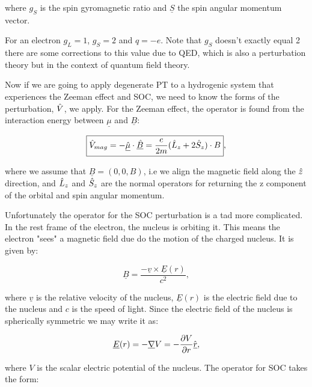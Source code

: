 \noindent where $g_S$ is the spin gyromagnetic ratio and $\underline{S}$ the spin angular momentum vector.

\noindent For an electron $g_L = 1$, $g_S = 2$ and $q = -e$. Note that $g_S$ doesn't exactly equal 2 there are some corrections to this value due to QED, which is also a perturbation theory but in the context of quantum field theory. 

\noindent Now if we are going to apply degenerate PT to a hydrogenic system that experiences the Zeeman effect and SOC, we need to know the forms of the perturbation, $\Hat{V}$, we apply. For the Zeeman effect, the operator is found from the interaction energy between $\underline\mu$ and $\underline{B}$:

\begin{equation}
    \boxed{\Hat{V}_{mag} = - \underline{\Hat{\mu}} \cdot \underline{\Hat{B}} = \frac{e}{2m}(\Hat{L}_z + 2\Hat{S}_z) \cdot B},
    \label{ZeemanEffectPerturbation}
\end{equation}

\noindent where we assume that $\underline{B} = (0, 0, B)$, i.e we align the magnetic field along the $\Hat{z}$ direction, and $\Hat{L}_z$ and $\Hat{S}_z$ are the normal operators for returning the z component of the orbital and spin angular momentum.

\noindent Unfortunately the operator for the SOC perturbation is a tad more complicated. In the rest frame of the electron, the nucleus is orbiting it. This means the electron "sees" a magnetic field due do the motion of the charged nucleus. It is given by:

\begin{equation}
    \underline{B} = \frac{-\underline{v} \times \underline{E}(r)}{c^2},
    \label{MagneticFieldSOC}
\end{equation}

\noindent where $\underline{v}$ is the relative velocity of the nucleus, $\underline{E}(r)$ is the electric field due to the nucleus and $c$ is the speed of light. Since the electric field of the nucleus is spherically symmetric we may write it as:

\begin{equation}
    \underline{E}(r) = -\underline{\nabla} V = -\frac{\partial V}{\partial r} \Hat{\underline{r}},
    \label{SphericalElectricField}
\end{equation}

\noindent where $V$ is the scalar electric potential of the nucleus. The operator for SOC takes the form:

